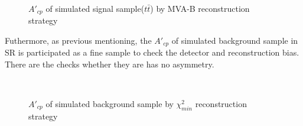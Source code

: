 		\begin{figure}[H]
			\centering
				\\
		\caption{$A'_{cp}$ of simulated signal sample($t\bar{t}$) by MVA-B reconstruction strategy}
		\label{AsymBias:fig:a05_noMlbcut_sim_tt_A'cp}
		\end{figure}
		\FloatBarrier


		Futhermore, as previous mentioning, the $A'_{cp}$ of simulated background sample in SR is participated as a fine sample to check the detector and reconstruction bias. There are the checks whether they are has no asymmetry.

		\begin{figure}[H]
			\centering
				\\
		\caption{$A'_{cp}$ of simulated background sample by $\chi^2_{min}$ reconstruction strategy}
		\label{AsymBias:fig:chi2_sim_bkg_A'cp}
		\end{figure}
		\FloatBarrier

